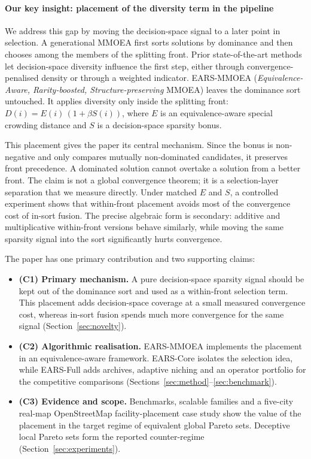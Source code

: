 \paragraph{Our key insight: placement of the diversity term in the pipeline} We address
this gap by moving the decision-space signal to a later point in selection. A generational
MMOEA first sorts solutions by dominance and then chooses among the members of the splitting
front. Prior state-of-the-art methods let decision-space diversity influence the first step, either through
convergence-penalised density or through a weighted indicator. EARS-MMOEA
(\emph{Equivalence-Aware, Rarity-boosted, Structure-preserving} MMOEA) leaves the dominance sort
untouched. It applies diversity only inside the splitting front:
$D(i)=E(i)\,(1+\beta S(i))$, where $E$ is an equivalence-aware special crowding distance and
$S$ is a decision-space sparsity bonus.

This placement gives the paper its central mechanism. Since the bonus is non-negative and only
compares mutually non-dominated candidates, it preserves front precedence. A dominated solution
cannot overtake a solution from a better front. The claim is not a global convergence theorem;
it is a selection-layer separation that we measure directly. Under matched $E$ and $S$, a
controlled experiment shows that within-front placement avoids most of the convergence cost of
in-sort fusion. The precise algebraic form is secondary: additive and multiplicative
within-front versions behave similarly, while moving the same sparsity signal into the sort
significantly hurts convergence.

The paper has one primary contribution and two supporting claims:
\begin{itemize}
  \item \textbf{(C1) Primary mechanism.} A pure decision-space sparsity signal should be kept out
  of the dominance sort and used as a within-front selection term. This placement adds
  decision-space coverage at a small measured convergence cost, whereas in-sort fusion spends much
  more convergence for the same signal (Section~\ref{sec:novelty}).
  \item \textbf{(C2) Algorithmic realisation.} EARS-MMOEA implements the placement in an
  equivalence-aware framework. EARS-Core isolates the selection idea, while EARS-Full adds
  archives, adaptive niching and an operator portfolio for the competitive comparisons
  (Sections~\ref{sec:method}--\ref{sec:benchmark}).
  \item \textbf{(C3) Evidence and scope.} Benchmarks, scalable families and a five-city real-map
  OpenStreetMap facility-placement case study show the value of the placement in the target regime of
  equivalent global Pareto sets. Deceptive local Pareto sets form the reported counter-regime
  (Section~\ref{sec:experiments}).
\end{itemize}

